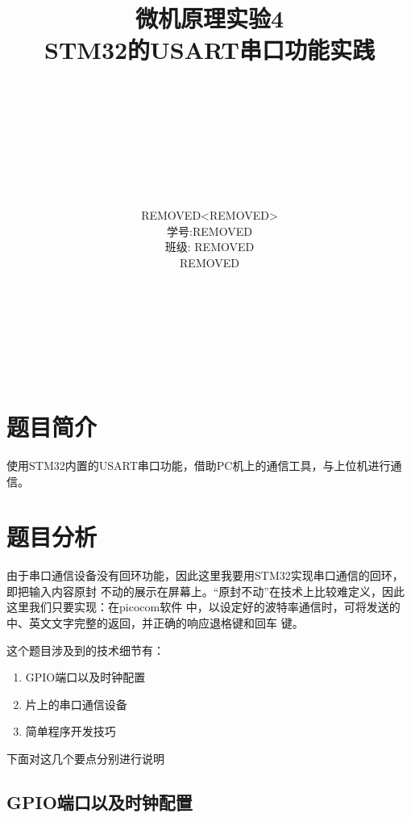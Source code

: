 \documentclass[a4paper]{ctexart}
\author{\\\\\\\\\\\\\\\\REMOVED<REMOVED>\\学号:REMOVED\\班级: REMOVED\\REMOVED\\\\\\\\\\\\\\}
\title{微机原理实验4\\STM32的USART串口功能实践}
\begin{document}
\begin{titlepage}
\maketitle
\thispagestyle{empty}
\newpage
\tableofcontents
\thispagestyle{empty}
\end{titlepage}

\setcounter{page}{1}
\lstset{language=C, 
    numbers=left, 
    frame=single,
    breaklines=true,
    breakautoindent=false,
    numberstyle=\tiny,
    fontadjust,
    basicstyle=\ttfamily
    }

\section{题目简介} 

使用STM32内置的USART串口功能，借助PC机上的通信工具，与上位机进行通信。

\section{题目分析}

由于串口通信设备没有回环功能，因此这里我要用STM32实现串口通信的回环，即把输入内容原封
不动的展示在屏幕上。“原封不动”在技术上比较难定义，因此这里我们只要实现：在picocom软件
中，以设定好的波特率通信时，可将发送的中、英文文字完整的返回，并正确的响应退格键和回车
键。

这个题目涉及到的技术细节有：
\begin{enumerate}[1.]
\item GPIO端口以及时钟配置
\item 片上的串口通信设备
\item 简单程序开发技巧
\end{enumerate}
下面对这几个要点分别进行说明

\subsection{GPIO端口以及时钟配置}
\end{document}
